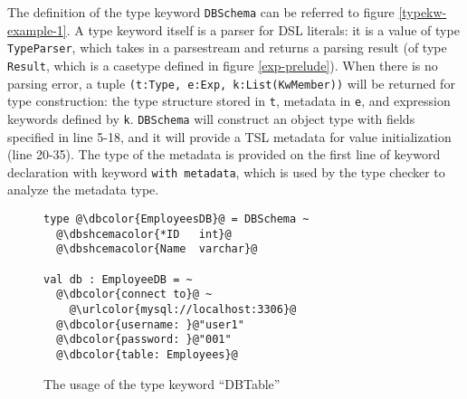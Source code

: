 \documentclass{sig-alternate}
\newcommand{\typekwparsercolor}[1]{\textcolor[HTML]{7C803E}{#1}}
\newcommand{\urlcolor}[1]{\textcolor[HTML]{FFCC33}{#1}}
\newcommand{\typecolor}[1]{\textcolor[HTML]{660066}{#1}}
\newcommand{\dbcolor}[1]{\textcolor[HTML]{FF47FF}{#1}}
\newcommand{\dbshcemacolor}[1]{\textcolor[HTML]{5AC3D1}{#1}}
\newcommand{\mycaption}[1]{\vspace{-4px}\caption{#1}\vspace{-2px}}
\begin{document}
The definition of the type keyword \verb|DBSchema| can be referred to figure \ref{typekw-example-1}. A type keyword itself is a parser for DSL literals: it is a value of type \verb|TypeParser|, which takes in a parsestream and returns a parsing result (of type \verb|Result|, which is a casetype defined in figure \ref{exp-prelude}). When there is no parsing error, a tuple \verb|(t:Type, e:Exp, k:List(KwMember))| will be returned for type construction: the type structure stored in \verb|t|, metadata in \verb|e|, and expression keywords defined by \verb|k|. \verb|DBSchema| will construct an object type with fields specified in line 5-18, and it will provide a TSL metadata for value initialization (line 20-35). The type of the metadata is provided on the first line of keyword declaration with keyword \verb|with metadata|, which is used by the type checker to analyze the metadata type.



\begin{figure}[t]
\begin{lstlisting}[style=wyvern]
type @\dbcolor{EmployeesDB}@ = DBSchema ~
  @\dbshcemacolor{*ID   int}@
  @\dbshcemacolor{Name  varchar}@

val db : EmployeeDB = ~
  @\dbcolor{connect to}@ ~
    @\urlcolor{mysql://localhost:3306}@
  @\dbcolor{username: }@"user1"
  @\dbcolor{password: }@"001"
  @\dbcolor{table: Employees}@
\end{lstlisting}
\mycaption{The usage of the type keyword ``DBTable''}
\label{f-tykwexample}
\end{figure}
\end{document}
